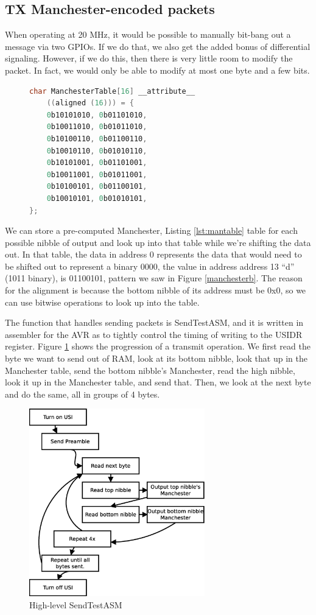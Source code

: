 \documentclass[13pt]{ltxdoc}
\begin{document}
\subsection{TX Manchester-encoded packets}
When operating at 20 MHz, it would be possible to manually bit-bang out a message
via two GPIOs.  If we do that, we also get the added bonus of differential
signaling.  However, if we do this, then there is very little room to modify
the packet.  In fact, we would only be able to modify at most one byte and a
few bits.


\begin{figure}
\begin{lstlisting}[caption=Manchester Lookup Table\label{lst:mantable},language=C, frame=single]
char ManchesterTable[16] __attribute__
	((aligned (16))) = {
	0b10101010, 0b01101010,
	0b10011010, 0b01011010,
	0b10100110, 0b01100110,
	0b10010110, 0b01010110,
	0b10101001, 0b01101001,
	0b10011001, 0b01011001,
	0b10100101, 0b01100101,
	0b10010101, 0b01010101,
};
\end{lstlisting}
\end{figure}

We can store a pre-computed Manchester, Listing \ref{lst:mantable} table for each possible nibble of output
and look up into that table while we're shifting the data out.  In that table, the data in address
0 represents the data that would need to be shifted out to represent a binary 0000, the value in address
address 13 ``d'' (1011 binary), is 01100101, pattern we saw in Figure \ref{manchesterb}.  The reason for the alignment
is because the bottom nibble of its address must be 0x0, so we can use bitwise operations to look up
into the table.

The function that handles sending packets is SendTestASM, and it is written in assembler for the AVR as
to tightly control the timing of writing to the USIDR register.  Figure \ref{sendexplain} shows the progression
of a transmit operation. We first
read the byte we want to send out of RAM, look at its bottom nibble, look that up in the Manchester
table, send the bottom nibble's  Manchester, read the high nibble, look it up in the Manchester table, and
send that.  Then, we look at the next byte and do the same, all in groups of 4 bytes.

\begin{figure}
    \centering
    \includegraphics[width=3.0in]{sendexplain}
    \caption{High-level SendTestASM}
    \label{sendexplain}
\end{figure}
\end{document}
